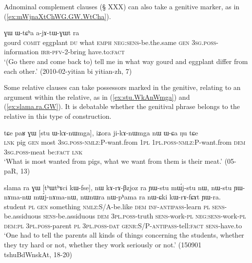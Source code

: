 Adnominal complement clauses (§ XXX) can also take a genitive marker, as in (\ref{ex:mWjnaXtChWG.GW.WtCha}).

\begin{exe}
\ex \label{ex:mWjnaXtChWG.GW.WtCha}
 ɣɯ ɯ-tɕʰa a-jɤ-tɯ-ɣɯt ra \\
gourd \textsc{comit} eggplant \textsc{du} what \textsc{emph} \textsc{neg}:\textsc{sens}-be.the.same \textsc{gen} \textsc{3sg}.\textsc{poss}-information \textsc{irr}-\textsc{pfv}-2-bring have.to:\textsc{fact} \\
\glt `(Go there and come back to) tell me in what way gourd and eggplant differ from each other.' (2010-02-yitian bi yitian-zh, 7)
\end{exe}

Some relative clauses can take possessors marked in the genitive, relating to an argument within the relative, as in  (\ref{ex:stu.WkAnWmga}) and (\ref{ex:slama.ra.GW}). It is debatable whether the genitival phrase belongs to the relative in this type of construction.

\begin{exe}
\ex \label{ex:stu.WkAnWmga}
 \gll tɕe paʁ ɣɯ [stu ɯ-kɤ-nɯmga], iʑora ji-kɤ-nɯmga nɯ ɯ-ɕa ŋu tɕe \\
 \textsc{lnk} pig \textsc{gen} most \textsc{3sg}.\textsc{poss}-\textsc{nmlz}:P-want.from \textsc{1pl} \textsc{1pl}.\textsc{poss}-\textsc{nmlz}:P-want.from \textsc{dem} \textsc{3sg}.\textsc{poss}-meat be:\textsc{fact} \textsc{lnk} \\
\glt  `What is most wanted from pigs, what we want from them is their meat.' (05-paR, 13)
\end{exe}

\begin{exe}
\ex \label{ex:slama.ra.GW}
\gll  slama ra ɣɯ [tʰɯtʰɤci kɯ-fse], nɯ kɤ-rɤ-βzjoz ra ɲɯ-stu mɯ́j-stu nɯ, nɯ-stu ɲɯ-nɤma-nɯ mɯ́j-nɤma-nɯ,  nɯnɯra nɯ-pʰama ra nɯ-ɕki kɯ-rɤ-fɕɤt ɲɯ-ra. \\
student \textsc{pl} \textsc{gen} something \textsc{nmlz}:S/A-be.like \textsc{dem}  \textsc{inf}-\textsc{antipass}-learn \textsc{pl} \textsc{sens}-be.assiduous \textsc{sens}-be.assiduous \textsc{dem} \textsc{3pl}.\textsc{poss}-truth \textsc{sens}-work-\textsc{pl} \textsc{neg:sens}-work-\textsc{pl} \textsc{dem}:\textsc{pl} \textsc{3pl}.\textsc{poss}-parent \textsc{pl} \textsc{3pl}.\textsc{poss}-\textsc{dat} \textsc{genr}:S/P-\textsc{antipass}-tell:\textsc{fact} \textsc{sens}-have.to \\
\glt `One had to tell the parents all kinds of things concerning the students, whether they try hard or not, whether they work seriously or not.' (150901 tshuBdWnskAt, 18-20)
\end{exe}


